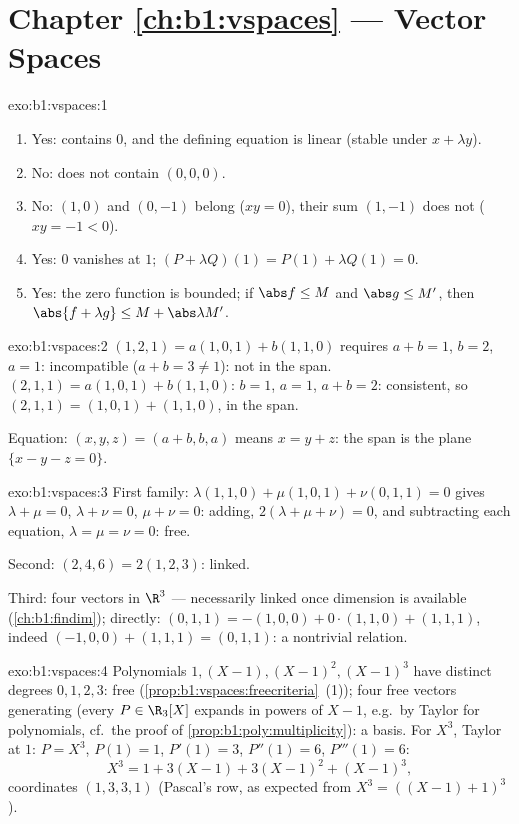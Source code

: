 \section*{Chapter \ref{ch:b1:vspaces} --- Vector Spaces}

\begin{solution}{exo:b1:vspaces:1}
\begin{enumerate}
  \item Yes: contains $0$, and the defining equation is linear
        (stable under $x + \lambda y$).
  \item No: does not contain $(0,0,0)$.
  \item No: $(1, 0)$ and $(0, -1)$ belong ($xy = 0$), their sum $(1,
        -1)$ does not ($xy = -1 < 0$).
  \item Yes: $0$ vanishes at $1$; $(P + \lambda Q)(1) = P(1) +
        \lambda Q(1) = 0$.
  \item Yes: the zero function is bounded; if $\abs f \leq M$ and
        $\abs g \leq M'$, then $\abs{f + \lambda g} \leq M +
        \abs\lambda M'$.
\end{enumerate}
\end{solution}

\begin{solution}{exo:b1:vspaces:2}
$(1,2,1) = a(1,0,1) + b(1,1,0)$ requires $a + b = 1$, $b = 2$, $a =
1$: incompatible ($a + b = 3 \neq 1$): not in the span. $(2,1,1) =
a(1,0,1) + b(1,1,0)$: $b = 1$, $a = 1$, $a + b = 2$: consistent, so
$(2,1,1) = (1,0,1) + (1,1,0)$, in the span.

Equation: $(x, y, z) = (a + b, b, a)$ means $x = y + z$: the span is
the plane $\{x - y - z = 0\}$.
\end{solution}

\begin{solution}{exo:b1:vspaces:3}
First family: $\lambda(1,1,0) + \mu(1,0,1) + \nu(0,1,1) = 0$ gives
$\lambda + \mu = 0$, $\lambda + \nu = 0$, $\mu + \nu = 0$: adding,
$2(\lambda + \mu + \nu) = 0$, and subtracting each equation,
$\lambda = \mu = \nu = 0$: free.

Second: $(2,4,6) = 2(1,2,3)$: linked.

Third: four vectors in $\R^3$ --- necessarily linked once dimension
is available (\cref{ch:b1:findim}); directly: $(0,1,1) = -(1,0,0) +
0\cdot(1,1,0) + (1,1,1)$, indeed $(-1,0,0) + (1,1,1) = (0,1,1)$: a
nontrivial relation.
\end{solution}

\begin{solution}{exo:b1:vspaces:4}
Polynomials $1, (X-1), (X-1)^2, (X-1)^3$ have distinct degrees $0,
1, 2, 3$: free (\cref{prop:b1:vspaces:freecriteria}~(1)); four free
vectors generating (every $P \in \R_3[X]$ expands in powers of $X -
1$, e.g.\ by Taylor for polynomials, cf.\ the proof of
\cref{prop:b1:poly:multiplicity}): a basis. For $X^3$, Taylor at
$1$: $P = X^3$, $P(1) = 1$, $P'(1) = 3$, $P''(1) = 6$, $P'''(1) =
6$:
\[
X^3 = 1 + 3(X - 1) + 3(X-1)^2 + (X-1)^3 ,
\]
coordinates $(1, 3, 3, 1)$ (Pascal's row, as expected from $X^3 =
((X-1)+1)^3$).
\end{solution}

